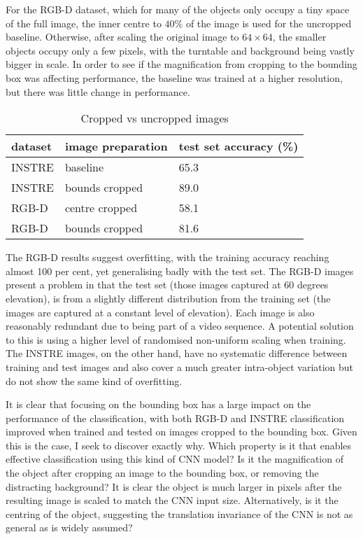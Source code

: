 For the RGB-D dataset, which for many of the objects only occupy a tiny space of the full image, the inner centre to $40\%$ of the image is used for the uncropped baseline. Otherwise, after scaling the original image to $ 64 \times 64$, the smaller objects occupy only a few pixels, with the turntable and background being vastly bigger in scale. In order to see if the magnification from cropping to the bounding box was affecting performance,  the baseline was trained at a higher resolution, but there was little change in performance.


\begin{table}[h]
  \centering
    \caption{Cropped vs uncropped images }
    
  \begin{tabular}{ l l l }
    
    dataset & image preparation & test set accuracy (\%) \\
    \toprule
    
    INSTRE & baseline &  65.3 \\
    INSTRE & bounds cropped & 89.0 \\
    
    RGB-D & centre cropped & 58.1 \\
    RGB-D & bounds cropped & 81.6 \\
    
    \bottomrule
  \end{tabular}
\label{fig:focus_crop}
\end{table}

The RGB-D results suggest overfitting, with the training accuracy reaching almost 100 per cent, yet generalising badly with the test set. The RGB-D images present a problem in that the test set (those images captured at 60 degrees elevation), is from a slightly different distribution from the training set (the images are captured at a constant level of elevation). Each image is also reasonably redundant due to being part of a video sequence. A potential solution to this is using a higher level of randomised non-uniform scaling when training. The INSTRE images, on the other hand, have no systematic difference between training and test images and also cover a much greater intra-object variation but do not show the same kind of overfitting.

It is clear that focusing on the bounding box has a large impact on the performance of the classification, with both RGB-D and INSTRE classification improved when trained and tested on images cropped to the bounding box. Given this is the case, I seek to discover exactly why. Which property is it that enables effective classification using this kind of CNN model? Is it the magnification of the object after cropping an image to the bounding box, or removing the distracting background? It is clear the object is much larger in pixels after the resulting image is scaled to match the CNN input size. Alternatively, is it the centring of the object, suggesting the translation invariance of the CNN is not as general as is widely assumed?


